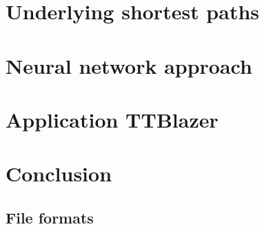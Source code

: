 \documentclass[a4paper]{article}
\numberwithin{algorithm}{section}
\numberwithin{figure}{section}
\numberwithin{table}{section}
\numberwithin{equation}{section}
\begin{document}
    \section{Underlying shortest paths}
    \label{sec:usp}
    
    \pagebreak
    
    \section{Neural network approach}
    \label{sec:neural}
    
    \pagebreak
    
    \section{Application TTBlazer}
    \label{sec:ttblazer}
    
    \pagebreak

    \section{Conclusion}
    \label{sec:concl}
    
    \pagebreak
    
    \begin{appendices}
  		\section{File formats}
  		\label{app:formats}
  		
	\end{appendices}
	\pagebreak



    
    {}
\end{document}
